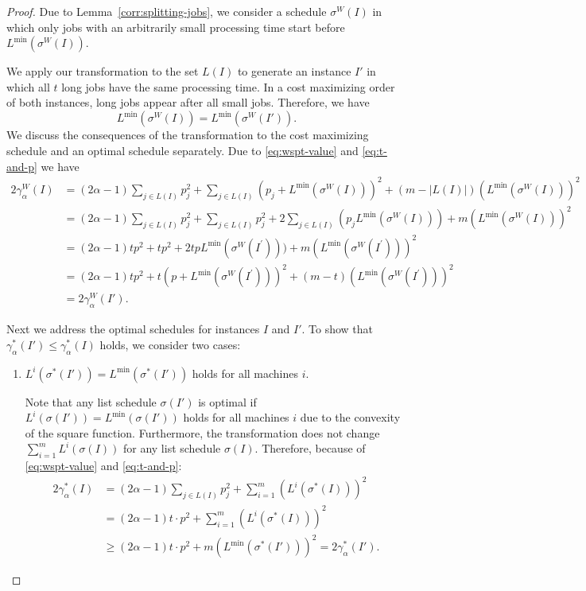 \documentclass[%
english, titlepage=false %
]{./tum-templates/book/tumbook}
\newcommand{\OptCost}{\gamma_{\alpha}^{*}(I)}
\newcommand{\WorstCost}{\gamma_{\alpha}^{W}(I)}
\begin{document}
\begin{proof}
Due to Lemma~\ref{corr:splitting-jobs}, we consider a schedule $\sigma^{W}(I)$ in which
only jobs with an arbitrarily small processing time start before
$L^{\min}(\sigma^{W}(I))$.

We apply our transformation to the set $L(I)$ to generate an instance $I'$ in
which all $t$ long jobs have the same processing time. In a cost maximizing order of
both instances, long jobs appear after all small jobs. Therefore, we have
\[
        L^{\min}(\sigma^{W}(I))=L^{\min}(\sigma^{W}(I')).
\]
We discuss the consequences of the transformation to the cost maximizing schedule
and an optimal schedule separately. Due to \eqref{eq:wspt-value} and \eqref{eq:t-and-p}
we have
\[
\begin{aligned}
        2\WorstCost
        &=
        (2\alpha-1)\sum_{j\in L(I)}p_j^2
        +
        \sum_{j\in L(I)}(p_j+L^{\min}(\sigma^{W}(I)))^2                  
        +(m-|L(I)|)(L^{\min}(\sigma^{W}(I)))^2                           \\
        &=
        (2\alpha-1)\sum_{j\in L(I)}p_j^2
        +
        \sum_{j\in L(I)}p_j^2
        +
        2\sum_{j\in L(I)}(p_jL^{\min}(\sigma^{W}(I)))               
        +m(L^{\min}(\sigma^{W}(I)))^2                                    \\
        &=
        (2\alpha-1)tp^2+tp^2
        +2tpL^{\min}(\sigma^{W}(I^{\prime})))
        +m(L^{\min}(\sigma^{W}(I^{\prime})))^2                                  \\[1mm]
        &=
        (2\alpha -1)tp^2
        +t(p+L^{\min}(\sigma^{W}(I^{\prime})))^2
        +(m-t)(L^{\min}(\sigma^{W}(I^{\prime})))^2                              \\
        &=
        2\gamma^{W}_{\alpha}(I').
\end{aligned}
\]

Next we address the optimal schedules for instances $I$ and $I'$. To show
that $\gamma^{*}_{\alpha}(I')\leq \OptCost$ holds, we consider two cases:

\begin{enumerate}[label=(\arabic*)]
\item
$L^{i}(\sigma^{*}(I'))=L^{\min}(\sigma^{*}(I'))$ holds for all machines $i$.

Note that any list schedule $\sigma(I')$ is optimal if
$L^{i}(\sigma(I'))=L^{\min}(\sigma(I'))$ holds for all machines $i$ due to the
convexity of the square function. Furthermore, the transformation does not
change $\sum_{i=1}^m L^{i}(\sigma(I))$ for any list schedule $\sigma(I)$.
Therefore, because of \eqref{eq:wspt-value} and \eqref{eq:t-and-p}:
\[
\begin{aligned}
        2\gamma^{*}_{\alpha}(I)
        &=
        (2\alpha-1)\sum_{j\in L(I)}p_j^2
        +
        \sum_{i=1}^m(L^{i}(\sigma^{*}(I)))^2                 \\
        &=
        (2\alpha-1)t\cdot p^2
        +
        \sum_{i=1}^m(L^{i}(\sigma^{*}(I)))^2                 \\
        &\geq
        (2\alpha-1)t\cdot p^2
        +
        m(L^{\min}(\sigma^{*}(I')))^2
        =
        2\gamma^{*}_{\alpha}(I').
\end{aligned}
\]


\end{enumerate}
\end{proof}
\end{document}
